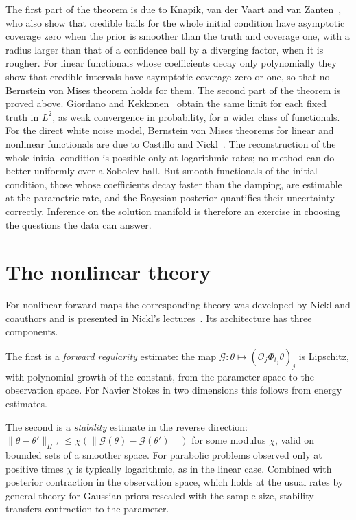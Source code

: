 The first part of the theorem is due to Knapik, van der Vaart and van Zanten~\cite{knapik2013}, who also show that credible balls for the whole initial condition have asymptotic coverage zero when the prior is smoother than the truth and coverage one, with a radius larger than that of a confidence ball by a diverging factor, when it is rougher. For linear functionals whose coefficients decay only polynomially they show that credible intervals have asymptotic coverage zero or one, so that no Bernstein von Mises theorem holds for them. The second part of the theorem is proved above. Giordano and Kekkonen~\cite[Example~10]{giordanokekkonen2020} obtain the same limit for each fixed truth in $L^2$, as weak convergence in probability, for a wider class of functionals. For the direct white noise model, Bernstein von Mises theorems for linear and nonlinear functionals are due to Castillo and Nickl~\cite{castillonickl2013}. The reconstruction of the whole initial condition is possible only at logarithmic rates; no method can do better uniformly over a Sobolev ball. But smooth functionals of the initial condition, those whose coefficients decay faster than the damping, are estimable at the parametric rate, and the Bayesian posterior quantifies their uncertainty correctly. Inference on the solution manifold is therefore an exercise in choosing the questions the data can answer.

\section{The nonlinear theory}

For nonlinear forward maps the corresponding theory was developed by Nickl and coauthors and is presented in Nickl's lectures~\cite{nickl2023book}. Its architecture has three components.

The first is a \emph{forward regularity} estimate: the map $\mathcal{G}:\theta\mapsto(\mathcal{O}_j\Phi_{t_j}\theta)_j$ is Lipschitz, with polynomial growth of the constant, from the parameter space to the observation space. For Navier Stokes in two dimensions this follows from energy estimates.

The second is a \emph{stability} estimate in the reverse direction: $\|\theta-\theta'\|_{H^{-s}}\leq\chi(\|\mathcal{G}(\theta)-\mathcal{G}(\theta')\|)$ for some modulus $\chi$, valid on bounded sets of a smoother space. For parabolic problems observed only at positive times $\chi$ is typically logarithmic, as in the linear case. Combined with posterior contraction in the observation space, which holds at the usual rates by general theory for Gaussian priors rescaled with the sample size, stability transfers contraction to the parameter.

